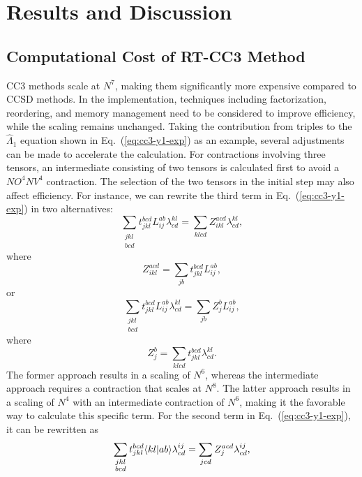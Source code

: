 \section{Results and Discussion} \label{results_cc3} 
\subsection{Computational Cost of RT-CC3 Method} \label{results-cc3-1}
CC3 methods scale at $N^{7}$, making them significantly more expensive compared to CCSD methods. In the implementation, techniques including factorization, reordering, and memory management need to be considered to improve efficiency, while the scaling remains unchanged. Taking the contribution from triples to the $\hat{\Lambda}_{1}$ equation shown in Eq.~(\ref{eq:cc3-y1-exp}) as an example, several adjustments can be made to accelerate the calculation. For contractions involving three tensors, an intermediate consisting of two tensors is calculated first to avoid a $NO^{4}NV^{4}$ contraction. The selection of the two tensors in the initial step may also affect efficiency. For instance, we can rewrite the third term in Eq.~(\ref{eq:cc3-y1-exp}) in two alternatives:
\begin{equation}
\sum\limits_{\substack{jkl\\bcd}}t_{jkl}^{bcd}L_{ij}^{ab}\lambda_{cd}^{kl} = \sum_{klcd}Z_{ikl}^{acd}\lambda_{cd}^{kl},
\end{equation}
where
\begin{equation}
Z_{ikl}^{acd}=\sum_{jb}t_{jkl}^{bcd}L_{ij}^{ab},
\end{equation}
or
\begin{equation}
\sum\limits_{\substack{jkl\\bcd}}t_{jkl}^{bcd}L_{ij}^{ab}\lambda_{cd}^{kl} = \sum_{jb}Z_{j}^{b}L_{ij}^{ab},
\end{equation}
where
\begin{equation}
Z_{j}^{b} = \sum_{klcd}t_{jkl}^{bcd}\lambda_{cd}^{kl}.
\end{equation}
The former approach results in a scaling of $N^{6}$, whereas the intermediate approach requires a contraction that scales at $N^{8}$. The latter approach results in a scaling of $N^{4}$ with an intermediate contraction of $N^{6}$, making it the favorable way to calculate this specific term. For the second term in Eq.~(\ref{eq:cc3-y1-exp}), it can be rewritten as
\begin{equation}
\sum\limits_{\substack{jkl\\bcd}}t_{jkl}^{bcd}\langle kl |ab \rangle \lambda_{cd}^{ij}=\sum_{jcd}Z_{j}^{acd}\lambda_{cd}^{ij},
\label{eq:cc3-result-l1-term211}
\end{equation}
